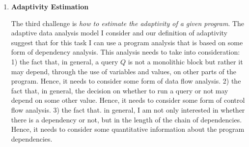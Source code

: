 \begin{enumerate}
\item 
\textbf{Adaptivity Estimation}

The third challenge is \emph{how to estimate the adaptivity of a given program}. 
The adaptive data analysis model I consider and our definition of adaptivity suggest that for this task 
I can use a program analysis that is based on some form of dependency analysis.
 This analysis needs to take into consideration:
1) the fact that, in general, a query $Q$ is not a monolithic block but rather it may depend, through the use of variables and values, on other parts of the program. 
Hence, it needs to consider some form of data flow analysis. 
2) the fact that, in general, the decision on whether to run a query or not may depend on some other value. Hence, 
 it needs to consider some form of control flow analysis.
3) the fact that. in general, I am not only interested in whether there is a dependency or not, but in the length of the chain of dependencies. 
Hence, it needs to consider some quantitative information about the program dependencies. %


\end{enumerate}
